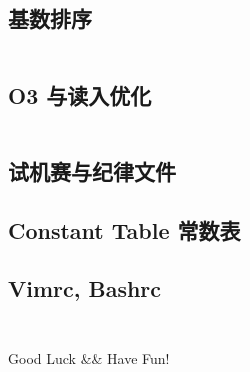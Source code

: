 \documentclass[titlepage, a4paper]{article}
\begin{document}
\begin{multicols}{2}
\begin{spacing}{0.6}
				\subsection{基数排序}
					\inputminted{cpp}{src/Miscellany/RadixSort.cpp}
				\subsection{O3 与读入优化}
					\inputminted{cpp}{src/Miscellany/hack.cpp}
				\subsection{试机赛与纪律文件}
				\begin{spacing}{0.5}
					
				\end{spacing}
				\subsection{Constant Table 常数表}
				\label{randomprimes}
				\begin{small}
					\setlength{\parindent}{0em}\setlength{\parskip}{0em}\renewcommand{\baselinestretch}{.8}
					\texttt{}
				\end{small}
				
				\subsection*{Vimrc, Bashrc}
				\inputminted{vim}{src/Miscellany/vimrc}
				\inputminted{sh}{src/Miscellany/bashrc}
					
					
		\begin{comment}
				\newpage
			\subsection*{Java Example}
				\inputminted{java}{src/Miscellany/Main2.java}
			\subsection*{Python Example}
				\inputminted{python}{src/Miscellany/test.py}
			\subsection*{Blossom}
				\inputminted{python}{src/TreeandGraph/Blossom.cpp}
			\subsection*{Chu-liu}
				\inputminted{cpp}{src/TreeandGraph/最小树形图.cpp}
			\subsection*{天动万象}
				\inputminted{cpp}{src/yzh/ByteCampA3.cpp}
		\end{comment}
		\end{spacing}
		\endgroup
	\end{multicols}
	\begin{center}
		\LARGE{Good Luck \&\& Have Fun!}
	\end{center}
	
\end{document}
